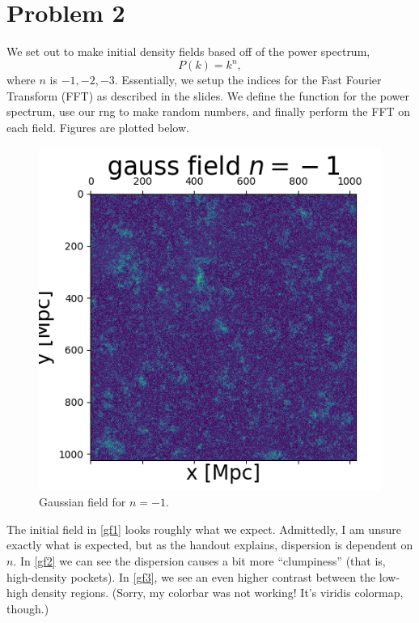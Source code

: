 \section{Problem 2}


We set out to make initial density fields based off of the power spectrum,
\begin{equation}
  P(k) = k^n,
\end{equation}
where $n$ is $-1, -2, -3$. Essentially, we setup the indices for the Fast
Fourier Transform (FFT) as described in the slides. We define the function
for the power spectrum, use our rng to make random numbers, and finally
perform the FFT on each field. Figures are plotted below.

\begin{figure}[h!]
    \centering
    \includegraphics[width=0.9\linewidth]{./plots/gauss_field_-1.png}
    \caption{Gaussian field for $n=-1$.}
    \label{gf1}
\end{figure}
The initial field in \autoref{gf1} looks roughly what we expect.
Admittedly, I am unsure exactly what is expected, but as the handout
explains, dispersion is dependent on $n$. In \autoref{gf2} we can see
the dispersion causes a bit more ``clumpiness'' (that is, high-density
pockets). In \autoref{gf3}, we see an even higher contrast between
the low-high density regions. (Sorry, my colorbar was not working! It's 
viridis colormap, though.)
